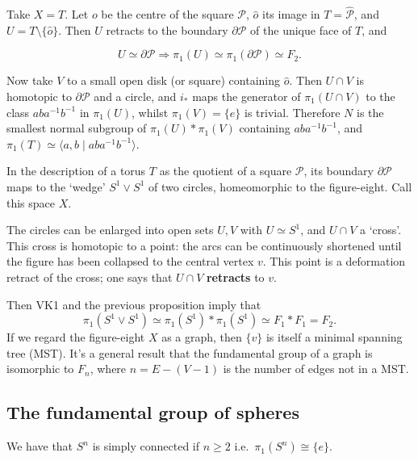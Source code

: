 \documentclass[12pt, a4paper]{article}
\begin{document}
\begin{mdexample}[VK2]
    Take \(X = T\). Let \(o\) be the centre of the square \(\mathcal{P}\), \(\hat{o}\) its image in \(T = \hat{\mathcal{P}}\), and \(U = T\setminus\{\hat{o}\}\). Then \(U\) retracts to the boundary \(\partial\mathcal{P}\) of the unique face of \(T\), and 

\[ U \simeq \partial\mathcal{P} \Rightarrow \pi_1(U) \simeq \pi_1(\partial\mathcal{P}) \simeq F_2. \]

Now take \(V\) to a small open disk (or square) containing \(\hat{o}\). Then \(U \cap V\) is homotopic to \(\partial\mathcal{P}\) and a circle, and \(i_*\) maps the generator of \(\pi_1(U \cap V)\) to the class \(aba^{-1}b^{-1}\) in \(\pi_1(U)\), whilst \(\pi_1(V) = \{e\}\) is trivial. Therefore \(N\) is the smallest normal subgroup of \(\pi_1(U) * \pi_1(V)\) containing \(aba^{-1}b^{-1}\), and \(\pi_1(T) \simeq \langle a, b \mid aba^{-1}b^{-1}\rangle\).
\end{mdexample}


\begin{mdexample}[VK2]
    In the description of a torus \( T \) as the quotient of a square \( \mathcal{P} \), its boundary \( \partial\mathcal{P} \) maps to the `wedge' \( S^1 \vee S^1 \) of two circles, homeomorphic to the figure-eight. Call this space \( X \). 
    
    The circles can be enlarged into open sets \( U, V \) with \( U \simeq S^1 \), and \( U \cap V \) a `cross'. This cross is homotopic to a point: the arcs can be continuously shortened until the figure has been collapsed to the central vertex \( v \). This point is a deformation retract of the cross; one says that \( U \cap V \) \textbf{retracts} to \( v \).
    
    Then VK1 and the previous proposition imply that
    \[ \pi_1(S^1 \vee S^1) \simeq \pi_1(S^1) * \pi_1(S^1) \simeq F_1 * F_1 = F_2. \]
    If we regard the figure-eight \( X \) as a graph, then \( \{v\} \) is itself a minimal spanning tree (MST). It's a general result that the fundamental group of a graph is isomorphic to \( F_n \), where \( n = E - (V - 1) \) is the number of edges not in a MST.
\end{mdexample}

\subsection{The fundamental group of spheres}

\begin{mdthm}
    We have that \(S^n\) is simply connected if \(n\geq 2\) i.e.\ \(\pi_1(S^n)\cong \{e\}\).
\end{mdthm}
\end{document}
